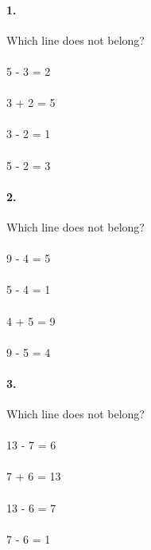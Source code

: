 \documentclass[12pt]{article}
\begin{document}
\paragraph{1.}
Which line does not belong?
\\
\\
5 - 3 = 2
\\
\\
3 + 2 = 5
\\
\\
3 - 2 = 1
\\
\\
5 - 2 = 3

\bigskip

\paragraph{2.}
Which line does not belong?
\\
\\
9 - 4 = 5
\\
\\
5 - 4 = 1
\\
\\
4 + 5 = 9
\\
\\
9 - 5 = 4

\bigskip

\paragraph{3.}
Which line does not belong?
\\
\\
13 - 7 = 6
\\
\\
7 + 6 = 13
\\
\\
13 - 6 = 7
\\
\\
7 - 6 = 1

\newpage
\end{document}
